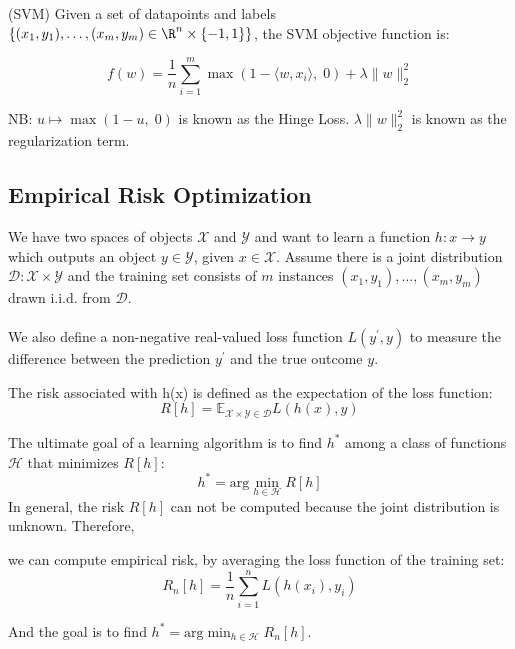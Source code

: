 \begin{definition}
(SVM) Given a set of datapoints and labels $\{(x_1, y_1),\dots,(x_m,y_m)\in \R^n\times \{-1,1\}\}$, the SVM objective function is:

\begin{equation*}
    f(w) = \frac{1}{n}\sum_{i=1}^m \max(1-\langle w, x_i\rangle,\; 0) + \lambda \|w\|_2^2
\end{equation*}

NB: $u\mapsto \max(1-u,\;0)$ is known as the Hinge Loss. $\lambda \|w\|_2^2$ is known as the regularization term.
\end{definition}

\subsection{Empirical Risk Optimization}
We have two spaces of objects $\mathcal{X}$ and ${\mathcal{Y}}$ and want to learn a function $h :x\to y$ which outputs an object $y\in \mathcal{Y}$, given $ x\in \mathcal{X}$. Assume there is a joint distribution $\mathcal{D}: \mathcal{X} \times \mathcal{Y}$ and the training set consists of $m$ instances $(x_1, y_1), \ldots, (x_m,y_m)$ drawn i.i.d. from $\mathcal{D}$.\\
\\
We also define a non-negative real-valued loss function $L (y^\prime,y)$ to measure the difference between the prediction $y^\prime$ and the true outcome $y$.

\begin{definition}
The risk associated with h(x) is defined as the expectation of the loss function:
\begin{equation*}
    R[h] = \mathbb{E}_{\mathcal{X} \times \mathcal{Y} \in \mathcal{D}} L(h(x),y)
\end{equation*}
\end{definition}
The ultimate goal of a learning algorithm is to find $h^*$ among a class of functions $\mathcal{H}$ that minimizes $R[h]$:
\begin{equation*}
    h^* = \text{arg}\min_{h \in \mathcal{H}} R[h]
\end{equation*}
In general, the risk $R[h]$ can not be computed because the joint distribution is unknown. Therefore,
\begin{definition}
we can compute empirical risk, by averaging the loss function of the training set:
\begin{equation*}
    R_n[h] = \frac{1}{n} \sum^n_{i=1}L(h(x_i),y_i)
\end{equation*}
\end{definition}
And the goal is to find $h^* = \text{arg}\min_{h \in \mathcal{H}} R_n[h]$.
